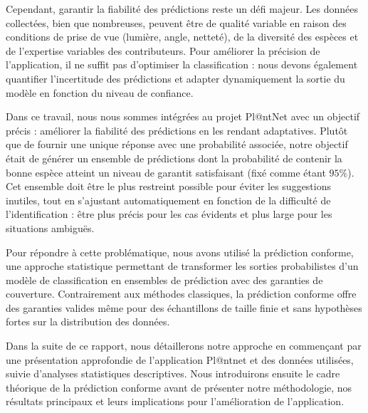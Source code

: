 \documentclass[a4paper,12pt]{article}
\begin{document}
\vspace{0.2cm}

Cependant, garantir la fiabilité des prédictions reste un défi majeur. Les données collectées, bien que nombreuses, peuvent être de qualité variable en raison des conditions de prise de vue (lumière, angle, netteté), de la diversité des espèces et de l'expertise variables des contributeurs. Pour améliorer la précision de l'application, il ne suffit pas d’optimiser la classification : nous devons également quantifier l’incertitude des prédictions et adapter dynamiquement la sortie du modèle en fonction du niveau de confiance.

\vspace{0.2cm}

Dans ce travail, nous nous sommes intégrées au projet Pl@ntNet avec un objectif précis : améliorer la fiabilité des prédictions en les rendant adaptatives. Plutôt que de fournir une unique réponse avec une probabilité associée, notre objectif était de générer un ensemble de prédictions dont la probabilité de contenir la bonne espèce atteint un niveau de garantit satisfaisant (fixé comme étant $95\%$). Cet ensemble doit être le plus restreint possible pour éviter les suggestions inutiles, tout en s'ajustant automatiquement en fonction de la difficulté de l’identification : être plus précis pour les cas évidents et plus large pour les situations ambiguës.

\vspace{0.2cm}

Pour répondre à cette problématique, nous avons utilisé la prédiction conforme, une approche statistique permettant de transformer les sorties probabilistes d'un modèle de classification en ensembles de prédiction avec des garanties de couverture. Contrairement aux méthodes classiques, la prédiction conforme offre des garanties valides même pour des échantillons de taille finie et sans hypothèses fortes sur la distribution des données.

\vspace{0.2cm}

Dans la suite de ce rapport, nous détaillerons notre approche en commençant par une présentation approfondie de l'application Pl@ntnet et des données utilisées, suivie d'analyses statistiques descriptives. Nous introduirons ensuite le cadre théorique de la prédiction conforme avant de présenter notre méthodologie, nos résultats principaux et leurs implications pour l'amélioration de l'application.

\end{document}
